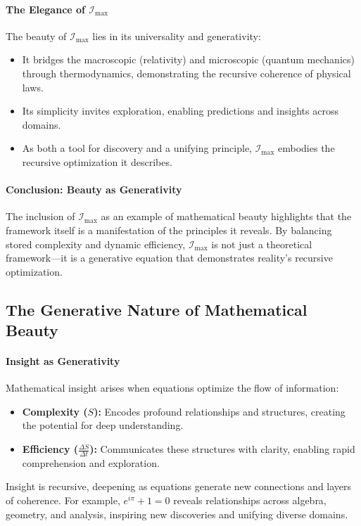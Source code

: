 \documentclass[12pt]{article}
\begin{document}
\paragraph{The Elegance of \(\mathcal{I}_{\text{max}}\)}
The beauty of \(\mathcal{I}_{\text{max}}\) lies in its universality and generativity:
\begin{itemize}
    \item It bridges the macroscopic (relativity) and microscopic (quantum mechanics) through thermodynamics, demonstrating the recursive coherence of physical laws.
    \item Its simplicity invites exploration, enabling predictions and insights across domains.
    \item As both a tool for discovery and a unifying principle, \(\mathcal{I}_{\text{max}}\) embodies the recursive optimization it describes.
\end{itemize}

\paragraph{Conclusion: Beauty as Generativity}
The inclusion of \(\mathcal{I}_{\text{max}}\) as an example of mathematical beauty highlights that the framework itself is a manifestation of the principles it reveals. By balancing stored complexity and dynamic efficiency, \(\mathcal{I}_{\text{max}}\) is not just a theoretical framework—it is a generative equation that demonstrates reality’s recursive optimization.

\subsection{The Generative Nature of Mathematical Beauty}

\paragraph{Insight as Generativity}
Mathematical insight arises when equations optimize the flow of information:
\begin{itemize}
    \item \textbf{Complexity (\(S\)):} Encodes profound relationships and structures, creating the potential for deep understanding.
    \item \textbf{Efficiency (\(\frac{\Delta S}{\Delta t}\)):} Communicates these structures with clarity, enabling rapid comprehension and exploration.
\end{itemize}
Insight is recursive, deepening as equations generate new connections and layers of coherence. For example, \( e^{i\pi} + 1 = 0 \) reveals relationships across algebra, geometry, and analysis, inspiring new discoveries and unifying diverse domains.
\end{document}
